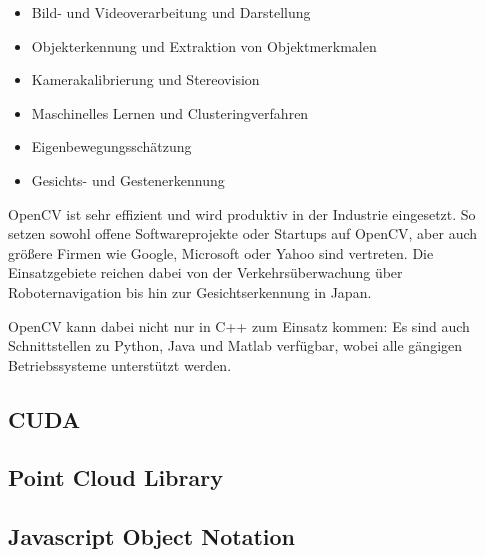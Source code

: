 \begin{itemize}
 \item Bild- und Videoverarbeitung und Darstellung
 \item Objekterkennung und Extraktion von Objektmerkmalen
 \item Kamerakalibrierung und Stereovision
 \item Maschinelles Lernen und Clusteringverfahren
 \item Eigenbewegungssch\"atzung
 \item Gesichts- und Gestenerkennung
\end{itemize}
 OpenCV ist sehr effizient und wird produktiv in der Industrie eingesetzt. So setzen sowohl offene Softwareprojekte oder Startups auf OpenCV, aber auch gr\"o\ss{}ere Firmen wie Google, Microsoft oder Yahoo sind vertreten. Die Einsatzgebiete reichen dabei von der Verkehrs\"uberwachung \"uber Roboternavigation bis hin zur Gesichtserkennung in Japan. 
 
 OpenCV kann dabei nicht nur in C++ zum Einsatz kommen: Es sind auch Schnittstellen zu Python, Java und Matlab verf\"ugbar, wobei alle g\"angigen Betriebssysteme unterst\"utzt werden.
\subsection*{CUDA}

\subsection*{Point Cloud Library}
\subsection*{Javascript Object Notation}
